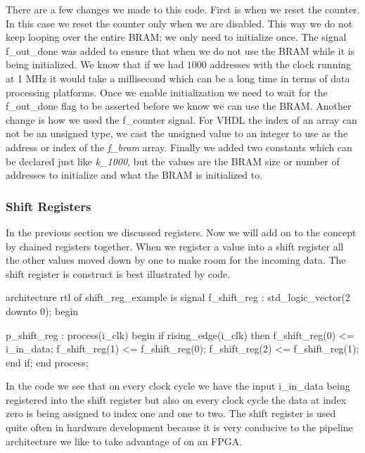 There are a few changes we made to this code. First is when we reset the counter. In this case we reset the counter only when we are disabled. This way we do not keep looping over the entire \ac{BRAM}; we only need to initialize once. The signal f\_out\_done was added to ensure that when we do not use the \ac{BRAM} while it is being initialized. We know that if we had $1000$ addresses with the clock running at 1 \ac{MHz} it would take a millisecond which can be a long time in terms of data processing platforms. Once we enable initialization we need to wait for the f\_out\_done flag to be asserted before we know we can use the \ac{BRAM}. Another change is how we used the f\_counter signal. For \ac{VHDL} the index of an array can not be an unsigned type, we cast the unsigned value to an integer to use as the address or index of the \emph{f\_bram} array. Finally we added two constants which can be declared just like \emph{k\_1000}, but the values are the \ac{BRAM} size or number of addresses to initialize and what the \ac{BRAM} is initialized to. 


\subsubsection{Shift Registers}

In the previous section we discussed registers. Now we will add on to the concept by chained registers together. When we register a value into a shift register all the other values moved down by one to make room for the incoming data. The shift register is construct is best illustrated by code. 

\begin{VHDLlisting}[tabsize=4]
architecture rtl of shift_reg_example is
    signal f_shift_reg : std_logic_vector(2 downto 0);
begin

p_shift_reg : process(i_clk)
begin
    if rising_edge(i_clk) then
        f_shift_reg(0) <= i_in_data;
        f_shift_reg(1) <= f_shift_reg(0);
        f_shift_reg(2) <= f_shift_reg(1);
    end if;
end process;
\end{VHDLlisting}

In the code we see that on every clock cycle we have the input i\_in\_data being registered into the shift register but also on every clock cycle the data at index zero is being assigned to index one and one to two. The shift register is used quite often in hardware development because it is very conducive to the pipeline architecture we like to take advantage of on an \ac{FPGA}.

